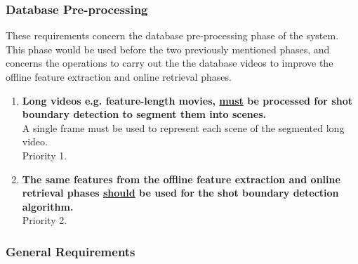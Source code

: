 \begin{enumerate}[label=F\arabic*,resume]
    

\end{enumerate}

\subsubsection{Database Pre-processing}

These requirements concern the database pre-processing phase of the system. This phase would be used before the two previously mentioned phases, and concerns the operations to carry out the the database videos to improve the offline feature extraction and online retrieval phases.

\begin{enumerate}[label=F\arabic*,resume]

    \item \textbf{Long videos e.g. feature-length movies, \underline{must} be processed for shot boundary detection to segment them into scenes.}\\
    A single frame must be used to represent each scene of the segmented long video.\\
    Priority 1.
    
    \item \textbf{The same features from the offline feature extraction and online retrieval phases \underline{should} be used for the shot boundary detection algorithm.}\\
    Priority 2.
    
\end{enumerate}

\subsubsection{General Requirements}

